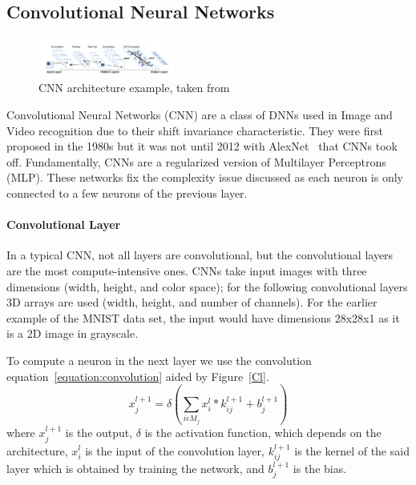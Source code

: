 \documentclass[conference]{IEEEtran}
\begin{document}
\subsection{Convolutional Neural Networks}
\label{section:cnn}

 \begin{figure}[!htb]
    \centering
    \includegraphics[width=0.4\textwidth]{Figures/convolutionlayer.png}
    \caption{CNN architecture example, taken from~\cite{cgracnn}}
    \label{CNNl}
\end{figure} 

Convolutional Neural Networks (CNN) are a class of DNNs used in Image and Video
recognition due to their shift invariance characteristic. They were first
proposed in the 1980s but it was not until 2012 with AlexNet~\cite{alexnet} that
CNNs took off. Fundamentally, CNNs are a regularized version of
Multilayer Perceptrons (MLP). These networks fix the complexity issue discussed
as each neuron is only connected to a few neurons of the previous layer.


\paragraph{Convolutional Layer}
\label{section:convlayer}

In a typical CNN, not all layers are convolutional, but the convolutional layers
are the most compute-intensive ones. CNNs take input images with three  dimensions
(width, height, and color space); for the following convolutional layers 3D
arrays are used (width, height, and number of channels). For the earlier example
of the MNIST data set, the input would have dimensions 28x28x1 as it is a 2D
image in grayscale.

To compute a neuron in the next layer we use the convolution
equation~\ref{equation:convolution} aided by Figure~\ref{Cl}.
\begin{equation} \label{equation:convolution}
    \displaystyle x_{j}^{l+1}=\delta (\sum_{i \epsilon M_{j}}x_{i}^{l} * k_{ij}^{l+1}+ b_{j}^{l+1})
\end{equation}
where $x_{j}^{l+1}$ is the output, $\delta$ is the activation function, which
depends on the architecture, $x_{i}^{l}$ is the input of the convolution layer,
$k_{ij}^{l+1}$ is the kernel of the said layer which is obtained by training the
network, and $b_{j}^{l+1}$ is the bias.
\end{document}

